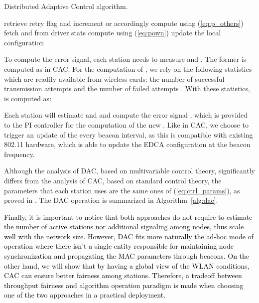\documentclass[a4paper,10pt]{article}
\newcommand{\revs}[1]{\textcolor{black}{#1}}
\begin{document}
\begin{algorithm}[!t]
 \caption{Distributed Adaptive Control algorithm.}
 \label{alg:dac}
 \begin{algorithmic}[1]
		\Repeat
					\State retrieve retry flag and 
					\State increment  or  accordingly
			\EndIf
		\State compute  using (\ref{eq:p_others}) 	
		\State fetch  and  from driver stats
		\State compute  using (\ref{eq:pown})
		\State 	
		\State 
		\State \hspace{4.2em} 
		\State update the local  configuration
	\EndWhile
\end{algorithmic}
\end{algorithm}

To compute the error signal, each station needs to measure  and . The former is computed as  in CAC. For the computation of , we rely on the following statistics which are readily available from wireless cards: the number of successful transmission attempts  and the number of failed attempts . With these statistics,  is computed as:


Each station will estimate  and  and compute the error signal , which is provided to the PI controller for the computation of the new . Like in CAC, we choose to trigger an update of the  every beacon interval, as this is compatible with existing 802.11 hardware, which is able to update the EDCA configuration at the beacon frequency. 

Although the analysis of DAC, based on multivariable control theory, significantly differs from the analysis of CAC, based on standard control theory, the  parameters that each station uses are the same ones of (\ref{eq:ctrl_params}), as proved in \cite{patras10tmc}. The DAC operation is summarized in Algorithm~\ref{alg:dac}.

\revs{Finally, it is important to notice that both approaches do not require to estimate the number of active stations nor additional signaling among nodes, thus scale well with the network size. However, DAC fits more naturally the ad-hoc mode of operation where there isn't a single entity responsible for maintaining node synchronization and propagating the MAC parameters through beacons. On the other hand, we will show that by having a global view of the WLAN conditions, CAC can ensure better fairness among stations. Therefore, a tradeoff between throughput fairness and algorithm operation paradigm is made when choosing one of the two approaches in a practical deployment.}
\end{document}
